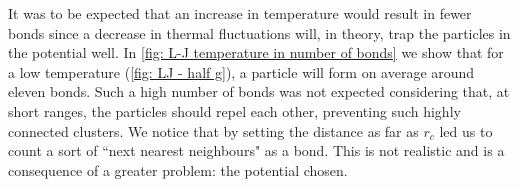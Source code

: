 \documentclass[../../main.tex]{subfiles}
\begin{document}
    It was to be expected that an increase in temperature would result in fewer bonds since a decrease in thermal fluctuations will, in theory, trap the particles in the potential well. In \cref{fig: L-J temperature in number of bonds} we show that for a low temperature (\cref{fig: LJ - half g}), a particle will form on average around eleven bonds. Such a high number of bonds was not expected considering that, at short ranges, the particles should repel each other, preventing such highly connected clusters. We notice that by setting the distance as far as $r_c$ led us to count a sort of ``next nearest neighbours" as a bond. This is not realistic and is a consequence of a greater problem: the potential chosen.    

\end{document}
